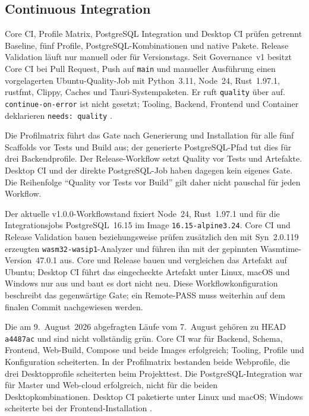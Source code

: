 \subsection{Continuous Integration}
\label{subsec:continuous-integration}

Core CI, Profile Matrix, PostgreSQL Integration und Desktop CI prüfen getrennt
Baseline, fünf Profile, PostgreSQL-Kombinationen und native Pakete. Release
Validation läuft nur manuell oder für Versionstags. Seit Governance~v1 besitzt
Core CI bei Pull Request, Push auf \texttt{main} und manueller Ausführung einen
vorgelagerten Ubuntu-Quality-Job mit Python~3.11, Node~24, Rust~1.97.1,
rustfmt, Clippy, Caches und Tauri-Systempaketen. Er ruft \texttt{quality} über
 auf. \texttt{continue-on-error} ist nicht gesetzt;
Tooling, Backend, Frontend und Container deklarieren \texttt{needs: quality}
\parencite{kleiveist2026quality-ci}.

Die Profilmatrix führt das Gate nach Generierung und Installation für alle
fünf Scaffolds vor Tests und Build aus; der generierte PostgreSQL-Pfad tut dies
für drei Backendprofile. Der Release-Workflow setzt Quality vor Tests und
Artefakte. Desktop CI und der direkte PostgreSQL-Job haben dagegen kein eigenes
Gate. Die Reihenfolge
\enquote{Quality vor Tests vor Build} gilt daher nicht pauschal für jeden Workflow.

Der aktuelle v1.0.0-Workflowstand fixiert Node~24, Rust~1.97.1 und für die
Integrationsjobs PostgreSQL~16.15 im Image \texttt{16.15-alpine3.24}. Core CI
und Release Validation bauen beziehungsweise prüfen zusätzlich den mit
Syn~2.0.119 erzeugten \texttt{wasm32-wasip1}-Analyzer und führen ihn mit der
gepinnten Wasmtime-Version~47.0.1 aus. Core und Release bauen und vergleichen
das Artefakt auf Ubuntu; Desktop CI führt das eingecheckte Artefakt unter
Linux, macOS und Windows nur aus und baut es dort nicht neu. Diese
Workflowkonfiguration beschreibt das gegenwärtige Gate; ein Remote-PASS muss
weiterhin auf dem finalen Commit nachgewiesen werden.

Die am 9.~August~2026 abgefragten Läufe vom 7.~August gehören zu HEAD
\texttt{a4487ac} und sind nicht vollständig grün. Core CI war für Backend,
Schema, Frontend, Web-Build, Compose und beide Images erfolgreich; Tooling,
Profile und Konfiguration scheiterten. In der Profilmatrix bestanden beide
Webprofile, die drei Desktopprofile scheiterten beim Projekttest. Die
PostgreSQL-Integration war für Master und Web-cloud erfolgreich, nicht für die
beiden Desktopkombinationen. Desktop CI paketierte unter Linux und macOS;
Windows scheiterte bei der
Frontend-Installation
\parencite{kleiveist2026ci-core-run,kleiveist2026ci-profiles-run,kleiveist2026ci-postgres-run,kleiveist2026ci-desktop-run}.


